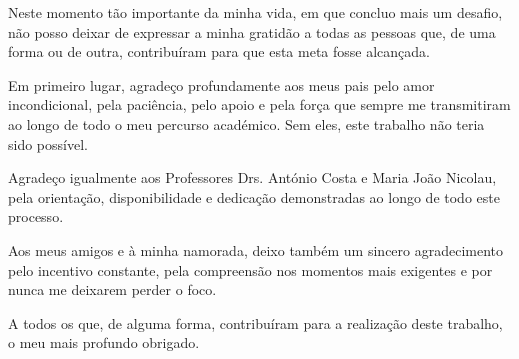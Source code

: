 
%

\begin{ntacknowledgements}
Neste momento tão importante da minha vida, em que concluo mais um desafio, não posso deixar de expressar a minha gratidão a todas as pessoas que, de uma forma ou de outra, contribuíram para que esta meta fosse alcançada.

Em primeiro lugar, agradeço profundamente aos meus pais pelo amor incondicional, pela paciência, pelo apoio e pela força que sempre me transmitiram ao longo de todo o meu percurso académico. Sem eles, este trabalho não teria sido possível.

Agradeço igualmente aos Professores Drs. António Costa e Maria João Nicolau, pela orientação, disponibilidade e dedicação demonstradas ao longo de todo este processo.

Aos meus amigos e à minha namorada, deixo também um sincero agradecimento pelo incentivo constante, pela compreensão nos momentos mais exigentes e por nunca me deixarem perder o foco.

A todos os que, de alguma forma, contribuíram para a realização deste trabalho, o meu mais profundo obrigado.


\end{ntacknowledgements}